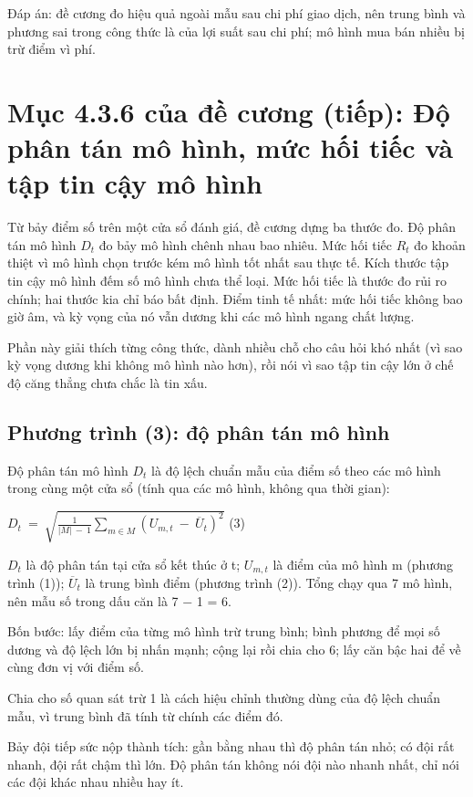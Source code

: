 Đáp án: đề cương đo hiệu quả ngoài mẫu sau chi phí giao dịch, nên trung bình và phương sai trong công thức là của lợi suất sau chi phí; mô hình mua bán nhiều bị trừ điểm vì phí.

\chapter{Mục 4.3.6 của đề cương (tiếp): Độ phân tán mô hình, mức hối tiếc và tập tin cậy mô hình}

Từ bảy điểm số trên một cửa sổ đánh giá, đề cương dựng ba thước đo. Độ phân tán mô hình \(D_{t}\) đo bảy mô hình chênh nhau bao nhiêu. Mức hối tiếc \(R_{t}\) đo khoản thiệt vì mô hình chọn trước kém mô hình tốt nhất sau thực tế. Kích thước tập tin cậy mô hình đếm số mô hình chưa thể loại. Mức hối tiếc là thước đo rủi ro chính; hai thước kia chỉ báo bất định. Điểm tinh tế nhất: mức hối tiếc không bao giờ âm, và kỳ vọng của nó vẫn dương khi các mô hình ngang chất lượng.

Phần này giải thích từng công thức, dành nhiều chỗ cho câu hỏi khó nhất (vì sao kỳ vọng dương khi không mô hình nào hơn), rồi nói vì sao tập tin cậy lớn ở chế độ căng thẳng chưa chắc là tin xấu.

\section{Phương trình (3): độ phân tán mô hình}

Độ phân tán mô hình \(D_{t}\) là độ lệch chuẩn mẫu của điểm số theo các mô hình trong cùng một cửa sổ (tính qua các mô hình, không qua thời gian):

\(D_{t}\  = \ \sqrt{\frac{1}{|M|\  - \ 1}\sum_{m \in M}^{}\left( U_{m,t}\  - \ {\overline{U}}_{t} \right)^{2}}\) (3)

\(D_{t}\) là độ phân tán tại cửa sổ kết thúc ở t; \(U_{m,t}\) là điểm của mô hình m (phương trình (1)); \({\overline{U}}_{t}\) là trung bình điểm (phương trình (2)). Tổng chạy qua 7 mô hình, nên mẫu số trong dấu căn là 7 − 1 = 6.

Bốn bước: lấy điểm của từng mô hình trừ trung bình; bình phương để mọi số dương và độ lệch lớn bị nhấn mạnh; cộng lại rồi chia cho 6; lấy căn bậc hai để về cùng đơn vị với điểm số.

Chia cho số quan sát trừ 1 là cách hiệu chỉnh thường dùng của độ lệch chuẩn mẫu, vì trung bình đã tính từ chính các điểm đó.

Bảy đội tiếp sức nộp thành tích: gần bằng nhau thì độ phân tán nhỏ; có đội rất nhanh, đội rất chậm thì lớn. Độ phân tán không nói đội nào nhanh nhất, chỉ nói các đội khác nhau nhiều hay ít.

